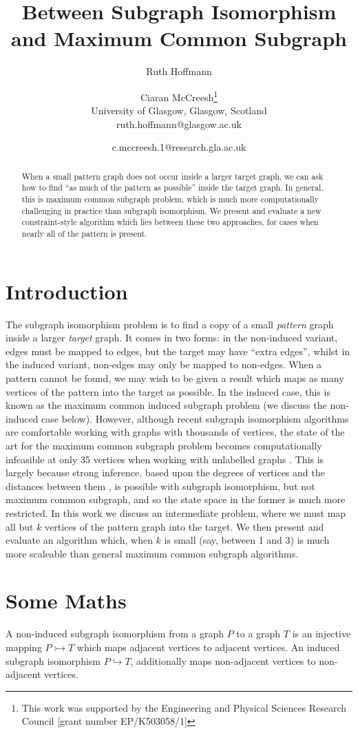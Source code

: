 \documentclass[letterpaper]{article}
\title{Between Subgraph Isomorphism and Maximum Common Subgraph}
\author{Ruth Hoffmann \and Ciaran McCreesh\thanks{This work was supported by the Engineering and Physical Sciences
    Research Council [grant number EP/K503058/1]} \\
University of Glasgow, Glasgow, Scotland \\
ruth.hoffmann@glasgow.ac.uk \and c.mccreesh.1@research.gla.ac.uk}
\newcommand{\citep}[1]{\cite{#1}}
\theoremstyle{definition}
\begin{document}
\maketitle

\begin{abstract}
    When a small pattern graph does not occur inside a larger target graph, we can ask how to find
    ``as much of the pattern as possible'' inside the target graph. In general, this is maximum
    common subgraph problem, which is much more computationally challenging in practice than
    subgraph isomorphism. We present and evaluate a new constraint-style algorithm which lies
    between these two approaches, for cases when nearly all of the pattern is present.
\end{abstract}

\section{Introduction}

The subgraph isomorphism problem is to find a copy of a small \emph{pattern} graph inside a larger
\emph{target} graph. It comes in two forms: in the non-induced variant, edges must be mapped to
edges, but the target may have ``extra edges'', whilst in the induced variant, non-edges may only be
mapped to non-edges. When a pattern cannot be found, we may wish to be given a result which maps as
many vertices of the pattern into the target as possible. In the induced case, this is known as the
maximum common induced subgraph problem (we discuss the non-induced case below). However, although
recent subgraph isomorphism algorithms are comfortable working with graphs with thousands of
vertices, the state of the art for the maximum common subgraph problem becomes computationally
infeasible at only 35 vertices when working with unlabelled graphs \citep{CP2016MCSPaper}. This is
largely because strong inference, based upon the degrees of vertices
\citep{DBLP:journals/ai/Solnon10} and the distances between them
\citep{DBLP:conf/cp/AudemardLMGP14,DBLP:conf/cp/McCreeshP15}, is possible with subgraph isomorphism,
but not maximum common subgraph, and so the state space in the former is much more restricted. In
this work we discuss an intermediate problem, where we must map all but $k$ vertices of the pattern
graph into the target. We then present and evaluate an algorithm which, when $k$ is small (say,
between 1 and 3) is much more scaleable than general maximum common subgraph algorithms.

\section{Some Maths}
A non-induced subgraph isomorphism from a graph $P$ to a graph $T$ is an injective mapping
$P \rightarrowtail T $ which maps adjacent vertices to adjacent vertices. An induced subgraph
isomorphism $P \hookrightarrow T$, additionally maps non-adjacent vertices to non-adjacent
 vertices.
\end{document}
